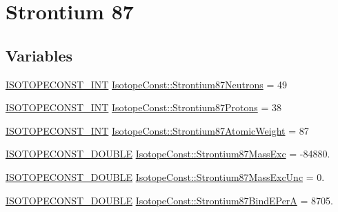 \hypertarget{group___isotope_const-_strontium-_sr87}{}\section{Strontium 87}
\label{group___isotope_const-_strontium-_sr87}
\subsection*{Variables}
\begin{DoxyCompactItemize}
\item 
\mbox{\hyperlink{group___isotope_const-_macros_ga5f18360b3e99483a35c32d789e62621c}{I\+S\+O\+T\+O\+P\+E\+C\+O\+N\+S\+T\+\_\+\+I\+NT}} \mbox{\hyperlink{group___isotope_const-_strontium-_sr87_gad61788ba5b52ec314c4c22c4257c0f5f}{Isotope\+Const\+::\+Strontium87\+Neutrons}} = 49
\item 
\mbox{\hyperlink{group___isotope_const-_macros_ga5f18360b3e99483a35c32d789e62621c}{I\+S\+O\+T\+O\+P\+E\+C\+O\+N\+S\+T\+\_\+\+I\+NT}} \mbox{\hyperlink{group___isotope_const-_strontium-_sr87_ga37bf020ad22e6fefc8a8ebdcb7a8d9ca}{Isotope\+Const\+::\+Strontium87\+Protons}} = 38
\item 
\mbox{\hyperlink{group___isotope_const-_macros_ga5f18360b3e99483a35c32d789e62621c}{I\+S\+O\+T\+O\+P\+E\+C\+O\+N\+S\+T\+\_\+\+I\+NT}} \mbox{\hyperlink{group___isotope_const-_strontium-_sr87_gae5ae708ee39dd0b7afae42c1134fc5f6}{Isotope\+Const\+::\+Strontium87\+Atomic\+Weight}} = 87
\item 
\mbox{\hyperlink{group___isotope_const-_macros_ga8f45a7272ce02c0b4c65c44636ed719a}{I\+S\+O\+T\+O\+P\+E\+C\+O\+N\+S\+T\+\_\+\+D\+O\+U\+B\+LE}} \mbox{\hyperlink{group___isotope_const-_strontium-_sr87_gaacc47cb2da7d87a82bb42871e51fcf4a}{Isotope\+Const\+::\+Strontium87\+Mass\+Exc}} = -\/84880.
\item 
\mbox{\hyperlink{group___isotope_const-_macros_ga8f45a7272ce02c0b4c65c44636ed719a}{I\+S\+O\+T\+O\+P\+E\+C\+O\+N\+S\+T\+\_\+\+D\+O\+U\+B\+LE}} \mbox{\hyperlink{group___isotope_const-_strontium-_sr87_ga49ad281c383d04eff98567e615a3c026}{Isotope\+Const\+::\+Strontium87\+Mass\+Exc\+Unc}} = 0.
\item 
\mbox{\hyperlink{group___isotope_const-_macros_ga8f45a7272ce02c0b4c65c44636ed719a}{I\+S\+O\+T\+O\+P\+E\+C\+O\+N\+S\+T\+\_\+\+D\+O\+U\+B\+LE}} \mbox{\hyperlink{group___isotope_const-_strontium-_sr87_gac5e9188fcea6d61d846c8e413f4b72e8}{Isotope\+Const\+::\+Strontium87\+Bind\+E\+PerA}} = 8705.
\item 

\end{DoxyCompactItemize}
